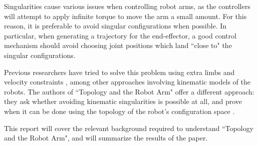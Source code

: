 \documentclass[12pt]{article}
\theoremstyle{definition}
\begin{document}
Singularities cause various issues when controlling robot arms, as the
controllers will attempt to apply infinite torque to move the arm a 
small amount. For this reason, it is preferable
to avoid singular configurations when possible. In particular, when generating a
trajectory for the end-effector, a good control mechanism should avoid choosing
joint positions which land ``close to" the singular configurations.

Previous researchers have tried to solve this problem using extra limbs
\cite{program-kin-red-manips} and velocity constraints
\cite{articulated-robot-redundancy}, among other approaches involving kinematic
models of the robots. The authors of
``Topology and the Robot Arm" offer a different approach: they ask whether
avoiding kinematic singularities is possible at all, and prove when it can be
done using the topology of the robot's configuration space
\cite{topology-robot-arm}.

This report will cover the relevant background required to understand 
``Topology and the Robot Arm",
and will summarize the results of the paper.
\end{document}
